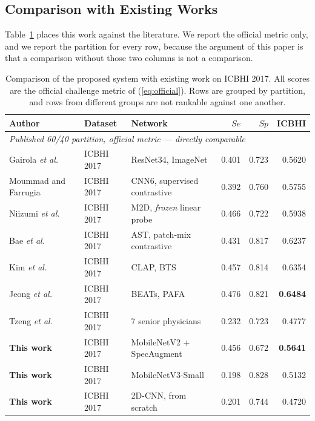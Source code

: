 \documentclass[journal,onecolumn]{IEEEtran}
\newcommand{\best}[1]{\textbf{#1}}
\begin{document}
\subsection{Comparison with Existing Works}
\label{subsec:comparison}

Table~\ref{tab:comparison} places this work against the literature. We report the
official metric only, and we report the partition for every row, because the
argument of this paper is that a comparison without those two columns is not a
comparison.

\begin{table}[!t]
\centering
\caption{Comparison of the proposed system with existing work on ICBHI 2017. All
scores are the official challenge metric of (\ref{eq:official}). Rows are grouped
by partition, and rows from different groups are not rankable against one another.}
\label{tab:comparison}
\small
\begin{tabular}{lllrrr}
\toprule
Author & Dataset & Network & $Se$ & $Sp$ & \best{ICBHI} \\
\midrule
\multicolumn{6}{l}{\emph{Published 60/40 partition, official metric --- directly comparable}}\\
Gairola \emph{et al.}~\cite{respirenet2021} & ICBHI 2017 & ResNet34, ImageNet & 0.401 & 0.723 & 0.5620 \\
Moummad and Farrugia~\cite{scl2023} & ICBHI 2017 & CNN6, supervised contrastive & 0.392 & 0.760 & 0.5755 \\
Niizumi \emph{et al.}~\cite{frozenfm2025} & ICBHI 2017 & M2D, \emph{frozen} linear probe & 0.466 & 0.722 & 0.5938 \\
Bae \emph{et al.}~\cite{bae2023patchmix} & ICBHI 2017 & AST, patch-mix contrastive & 0.431 & 0.817 & 0.6237 \\
Kim \emph{et al.}~\cite{bts2024} & ICBHI 2017 & CLAP, BTS & 0.457 & 0.814 & 0.6354 \\
Jeong \emph{et al.}~\cite{pafa2025} & ICBHI 2017 & BEATs, PAFA & 0.476 & 0.821 & \best{0.6484} \\
Tzeng \emph{et al.}~\cite{tzeng2025jmir} & ICBHI 2017 & 7 senior physicians & 0.232 & 0.723 & 0.4777 \\
\addlinespace
\best{This work} & ICBHI 2017 & MobileNetV2 + SpecAugment & 0.456 & 0.672 & \best{0.5641} \\
\best{This work} & ICBHI 2017 & MobileNetV3-Small & 0.198 & 0.828 & 0.5132 \\
\best{This work} & ICBHI 2017 & 2D-CNN, from scratch & 0.201 & 0.744 & 0.4720 \\

\end{tabular}
\end{table}
\end{document}
